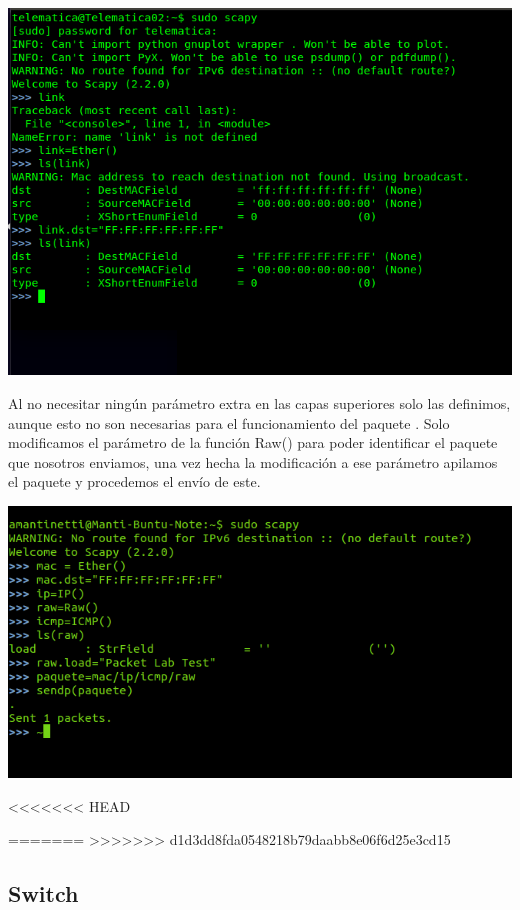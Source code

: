 \documentclass[spanish]{udpreport}
\begin{document}
\begin{center}
	\includegraphics[scale=.37]{imagenes/Switch/Test_1a_b.png}
\end{center}

Al no necesitar ningún parámetro extra en las capas superiores solo las definimos, aunque esto no son necesarias para el funcionamiento del paquete . Solo modificamos el parámetro de la función Raw() para poder identificar el paquete que nosotros enviamos, una vez hecha la modificación a ese parámetro apilamos el paquete y procedemos el envío de este.


\begin{center}
	\includegraphics[scale=.37]{imagenes/Switch/Test_1a_c.png}
\end{center}
<<<<<<< HEAD

\pagebreak

=======
\newpage
>>>>>>> d1d3dd8fda0548218b79daabb8e06f6d25e3cd15
\subsection{Switch}
\end{document}
